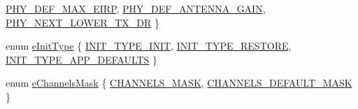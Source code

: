 \begin{DoxyCompactItemize}
\newline
\mbox{\hyperlink{group___r_e_g_i_o_n_gga51cbe8f5433d914fe9cf81b451de2c2da5bdce0ffd449781819a0d87732ebd2b7}{P\+H\+Y\+\_\+\+D\+E\+F\+\_\+\+M\+A\+X\+\_\+\+E\+I\+RP}}, 
\mbox{\hyperlink{group___r_e_g_i_o_n_gga51cbe8f5433d914fe9cf81b451de2c2da37b73a543ea79ce58bf18035329ba773}{P\+H\+Y\+\_\+\+D\+E\+F\+\_\+\+A\+N\+T\+E\+N\+N\+A\+\_\+\+G\+A\+IN}}, 
\mbox{\hyperlink{group___r_e_g_i_o_n_gga51cbe8f5433d914fe9cf81b451de2c2dac002e7e492cf30dbf9c544b062f5cc8a}{P\+H\+Y\+\_\+\+N\+E\+X\+T\+\_\+\+L\+O\+W\+E\+R\+\_\+\+T\+X\+\_\+\+DR}}
 \}
\item 
enum \mbox{\hyperlink{group___r_e_g_i_o_n_ga11ecad794560a3d3961bdf1c9a27d3b2}{e\+Init\+Type}} \{ \mbox{\hyperlink{group___r_e_g_i_o_n_gga11ecad794560a3d3961bdf1c9a27d3b2a5065ce7a587a2aeff0da16507222c4d7}{I\+N\+I\+T\+\_\+\+T\+Y\+P\+E\+\_\+\+I\+N\+IT}}, 
\mbox{\hyperlink{group___r_e_g_i_o_n_gga11ecad794560a3d3961bdf1c9a27d3b2aed3218cb3c4ebbb74a1b48e4f8ac8599}{I\+N\+I\+T\+\_\+\+T\+Y\+P\+E\+\_\+\+R\+E\+S\+T\+O\+RE}}, 
\mbox{\hyperlink{group___r_e_g_i_o_n_gga11ecad794560a3d3961bdf1c9a27d3b2a3d260b94611dd833c5243c16ca26c3f0}{I\+N\+I\+T\+\_\+\+T\+Y\+P\+E\+\_\+\+A\+P\+P\+\_\+\+D\+E\+F\+A\+U\+L\+TS}}
 \}
\item 
enum \mbox{\hyperlink{group___r_e_g_i_o_n_ga7a62e669f567fc160ad58210664bca9c}{e\+Channels\+Mask}} \{ \mbox{\hyperlink{group___r_e_g_i_o_n_gga7a62e669f567fc160ad58210664bca9ca1e68275c0b16a0c4935eada4315dd089}{C\+H\+A\+N\+N\+E\+L\+S\+\_\+\+M\+A\+SK}}, 
\mbox{\hyperlink{group___r_e_g_i_o_n_gga7a62e669f567fc160ad58210664bca9ca9bbb18c8600ad8781ba04a2cb121ea60}{C\+H\+A\+N\+N\+E\+L\+S\+\_\+\+D\+E\+F\+A\+U\+L\+T\+\_\+\+M\+A\+SK}}
 \}
\end{DoxyCompactItemize}
